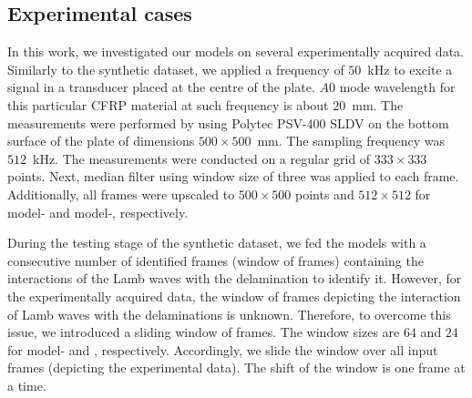 \subsection{Experimental cases}
In this work, we investigated our models on several experimentally acquired data.
Similarly to the synthetic dataset, we applied a frequency of \(50\)~kHz to excite a signal in a transducer placed at the centre of the plate. 
\(A0\) mode wavelength for this particular CFRP material at such frequency is about \(20\)~mm. 
The measurements were performed by using Polytec PSV-\(400\) SLDV on the bottom surface of the plate of dimensions \(500\times500\)~mm. 
The sampling frequency was \(512\)~kHz. 
The measurements were conducted on a regular grid of \(333\times333\) points. 
Next, median filter using window size of three was applied to each frame. Additionally, all frames were upscaled to \(500\times500\) points and \(512\times512\) for model- and model-, respectively.

During the testing stage of the synthetic dataset,  we fed the models with a consecutive number of identified frames (window of frames) containing the interactions of the Lamb waves with the delamination to identify it.
However, for the experimentally acquired data, the window of frames depicting the interaction of Lamb waves with the delaminations is unknown.
Therefore, to overcome this issue, we introduced a sliding window of frames. 
The window sizes are \(64\) and \(24\) for model- and , respectively.
Accordingly, we slide the window over all input frames (depicting the experimental data).
The shift of the window is one frame at a time. 
